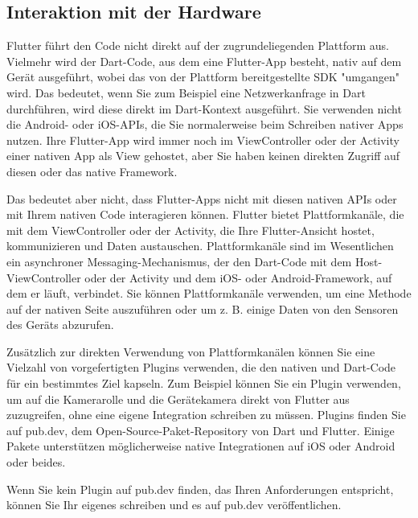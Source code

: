 \subsection{Interaktion mit der Hardware}

Flutter führt den Code nicht direkt auf der zugrundeliegenden Plattform aus. Vielmehr wird der Dart-Code, aus dem eine Flutter-App besteht, nativ auf dem Gerät ausgeführt, wobei das von der Plattform bereitgestellte SDK "umgangen" wird. Das bedeutet, wenn Sie zum Beispiel eine Netzwerkanfrage in Dart durchführen, wird diese direkt im Dart-Kontext ausgeführt. Sie verwenden nicht die Android- oder iOS-APIs, die Sie normalerweise beim Schreiben nativer Apps nutzen. Ihre Flutter-App wird immer noch im ViewController oder der Activity einer nativen App als View gehostet, aber Sie haben keinen direkten Zugriff auf diesen oder das native Framework.

Das bedeutet aber nicht, dass Flutter-Apps nicht mit diesen nativen APIs oder mit Ihrem nativen Code interagieren können. Flutter bietet Plattformkanäle, die mit dem ViewController oder der Activity, die Ihre Flutter-Ansicht hostet, kommunizieren und Daten austauschen. Plattformkanäle sind im Wesentlichen ein asynchroner Messaging-Mechanismus, der den Dart-Code mit dem Host-ViewController oder der Activity und dem iOS- oder Android-Framework, auf dem er läuft, verbindet. Sie können Plattformkanäle verwenden, um eine Methode auf der nativen Seite auszuführen oder um z. B. einige Daten von den Sensoren des Geräts abzurufen.

Zusätzlich zur direkten Verwendung von Plattformkanälen können Sie eine Vielzahl von vorgefertigten Plugins verwenden, die den nativen und Dart-Code für ein bestimmtes Ziel kapseln. Zum Beispiel können Sie ein Plugin verwenden, um auf die Kamerarolle und die Gerätekamera direkt von Flutter aus zuzugreifen, ohne eine eigene Integration schreiben zu müssen. Plugins finden Sie auf pub.dev, dem Open-Source-Paket-Repository von Dart und Flutter. Einige Pakete unterstützen möglicherweise native Integrationen auf iOS oder Android oder beides.

Wenn Sie kein Plugin auf pub.dev finden, das Ihren Anforderungen entspricht, können Sie Ihr eigenes schreiben und es auf pub.dev veröffentlichen.


